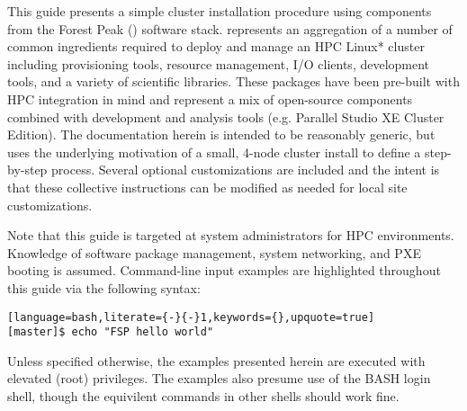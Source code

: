 This guide presents a simple cluster installation procedure using components
from the Forest Peak (\FSP{}) software stack. \FSP{} represents an aggregation of a number of
common ingredients required to deploy and manage an HPC Linux* cluster including
provisioning tools, resource management, I/O clients, development tools, and a variety of
scientific libraries. These packages have been pre-built with HPC integration
in mind and represent a mix of open-source components combined with \Intel{}
development and analysis tools (e.g. \Intel{} Parallel Studio XE Cluster Edition).
The documentation herein is intended to be reasonably generic, but uses the
underlying motivation of a small, 4-node cluster install to define a step-by-step
process. Several optional customizations are included and the intent is that
these collective instructions can be modified as needed for local site
customizations. 

Note that this guide is targeted at \Linux{} system administrators for HPC
environments. Knowledge of software package management, system networking, and
PXE booting is assumed.  Command-line input examples are highlighted throughout
this guide via the following syntax:

\begin{lstlisting}[language=bash,literate={-}{-}1,keywords={},upquote=true]
[master]$ echo "FSP hello world"
\end{lstlisting}

Unless specified otherwise, the examples presented herein are executed with
elevated (root) privileges. The examples also presume use of the BASH login
shell, though the equivilent commands in other shells should work fine.

